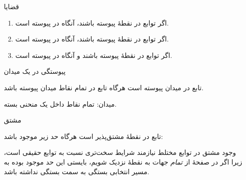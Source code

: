 \EMhold


\begin{EMtheorem}{قضایا}

\begin{enumerate}
\def\labelenumi{\arabic{enumi}.}
\tightlist
\item
  اگر توابع  در نقطهٔ  پیوسته باشند، آنگاه  در  پیوسته است.
\item
  اگر توابع  در نقطهٔ  پیوسته باشند، آنگاه  در  پیوسته است.
\item
  اگر توابع  در نقطهٔ  پیوسته باشند و  آنگاه  در  پیوسته است.
\end{enumerate}

\end{EMtheorem}

\begin{EMdefinition}{پیوستگی در یک میدان}

تابع  در میدان  پیوسته است هرگاه تابع  در تمام نقاط میدان  پیوسته باشد.

میدان: تمام نقاط داخل یک منحنی بسته.

\end{EMdefinition}

\begin{EMunit}


\end{EMunit}

\EMhold


\begin{EMdefinition}{مشتق}

تابع  در نقطهٔ  مشتق‌پذیر است هرگاه حد زیر موجود باشد:

\end{EMdefinition}

\begin{EMremark}{}

وجود مشتق در توابع مختلط نیازمند شرایط سخت‌تری نسبت به توابع حقیقی است، زیرا اگر در صفحهٔ  از \emph{تمام} جهات به نقطهٔ  نزدیک شویم، بایستی این حد موجود بوده به مسیر انتخابی بستگی به سمت  بستگی نداشته باشد.

\end{EMremark}

